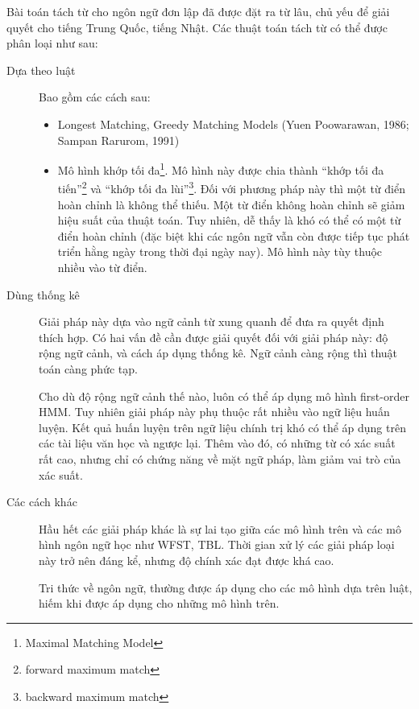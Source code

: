 \documentclass[a4paper,oneside,14pt]{extbook} %
\newcommand{\note}[1]{\underline{#1}}
\begin{document}
Bài toán tách từ cho ngôn ngữ đơn lập đã được đặt ra từ lâu, chủ yếu
để giải quyết cho tiếng Trung Quốc, tiếng Nhật. Các thuật toán tách từ có thể
được phân loại như sau:

\begin{description}
\item[Dựa theo luật] Bao gồm các cách sau:

  \begin{itemize}
  \item Longest Matching, Greedy Matching Models (Yuen Poowarawan, 1986;
    Sampan Rarurom, 1991)
  \item Mô hình khớp tối đa\footnote{Maximal Matching Model}. Mô hình
    này được chia thành ``khớp tối đa tiến''\footnote{forward maximum
    match} và ``khớp tối đa lùi''\footnote{backward maximum match}. Đối
    với phương pháp này thì một từ điển hoàn chỉnh là không thể
    thiếu. Một từ điển không hoàn chỉnh sẽ giảm hiệu suất của thuật
    toán. Tuy nhiên, dễ thấy là khó có thể có một từ điển hoàn chỉnh
    (đặc biệt khi các ngôn ngữ vẫn còn được tiếp tục phát triển hằng
    ngày trong thời đại ngày nay). Mô hình này tùy thuộc nhiều vào từ
    điển. 
  \end{itemize}
\item[Dùng thống kê]
  Giải pháp này dựa vào ngữ cảnh từ xung quanh để đưa ra quyết định
  thích hợp. Có hai vấn đề cần được giải quyết đối với giải pháp này:
  độ rộng ngữ cảnh, và cách áp dụng thống kê. Ngữ cảnh càng rộng thì
  thuật toán càng phức tạp.

  Cho dù độ rộng ngữ cảnh thế nào, luôn có thể áp dụng mô hình
  first-order HMM. Tuy nhiên giải pháp này phụ thuộc rất nhiều vào ngữ
  liệu huấn luyện. Kết quả huấn luyện trên ngữ liệu chính trị khó có
  thể áp dụng trên các tài liệu văn học và ngược lại. Thêm vào đó, có
  những từ có xác suất rất cao, nhưng chỉ có chứng năng về mặt ngữ
  pháp, làm giảm vai trò của xác suất.
\item[Các cách khác]
  Hầu hết các giải pháp khác là sự lai tạo giữa các mô hình trên và
  các mô hình ngôn ngữ học như WFST, TBL. Thời gian xử lý
  các giải pháp loại này trở nên đáng kể, nhưng độ chính xác đạt được
  khá cao.

  Tri thức về ngôn ngữ, thường được áp dụng cho các mô hình dựa trên
  luật, hiếm khi được áp dụng cho những mô hình trên.
\end{description}
\end{document}
